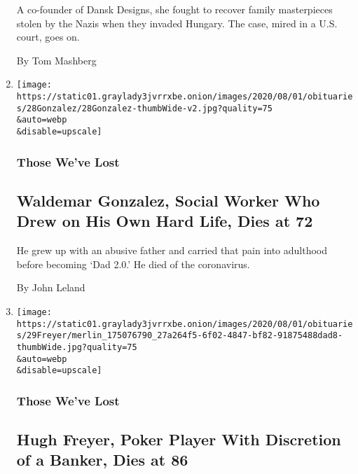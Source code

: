 \begin{enumerate}
  A co-founder of Dansk Designs, she fought to recover family
  masterpieces stolen by the Nazis when they invaded Hungary. The case,
  mired in a U.S. court, goes on.

  By Tom Mashberg
\item
  \href{/2020/07/30/obituaries/waldemar-gonzalez-dead-coronavirus.html}{}

  \texttt{[image: https://static01.graylady3jvrrxbe.onion/images/2020/08/01/obituaries/28Gonzalez/28Gonzalez-thumbWide-v2.jpg?quality=75\\\&auto=webp\\\&disable=upscale]}

  \hypertarget{those-weve-lost-1}{%
  \subsubsection{Those We've Lost}\label{those-weve-lost-1}}

  \hypertarget{waldemar-gonzalez-social-worker-who-drew-on-his-own-hard-life-dies-at-72}{%
  \subsection{Waldemar Gonzalez, Social Worker Who Drew on His Own Hard
  Life, Dies at
  72}\label{waldemar-gonzalez-social-worker-who-drew-on-his-own-hard-life-dies-at-72}}

  He grew up with an abusive father and carried that pain into adulthood
  before becoming `Dad 2.0.' He died of the coronavirus.

  By John Leland
\item
  \href{/2020/07/30/obituaries/hugh-freyer-dead-coronavirus.html}{}

  \texttt{[image: https://static01.graylady3jvrrxbe.onion/images/2020/08/01/obituaries/29Freyer/merlin\_175076790\_27a264f5-6f02-4847-bf82-91875488dad8-thumbWide.jpg?quality=75\\\&auto=webp\\\&disable=upscale]}

  \hypertarget{those-weve-lost-2}{%
  \subsubsection{Those We've Lost}\label{those-weve-lost-2}}

  \hypertarget{hugh-freyer-poker-player-with-discretion-of-a-banker-dies-at-86-1}{%
  \subsection{Hugh Freyer, Poker Player With Discretion of a Banker,
  Dies at
  86}\label{hugh-freyer-poker-player-with-discretion-of-a-banker-dies-at-86-1}}


\end{enumerate}
